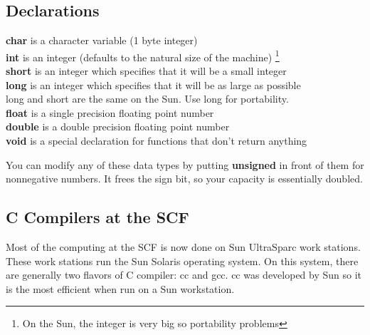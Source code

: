 \documentclass{article}
\begin{document}
\subsection{Declarations}
\label{sec:declarations}

{\bf char} is a character variable (1 byte integer)\\
{\bf int} is an integer (defaults to the natural size of the machine)
\footnote{On the Sun, the integer is very big so portability problems}\\
{\bf short} is an integer which specifies that it will be a small integer\\
{\bf long} is an integer which specifies that it will be as large as possible\\
long and short are the same on the Sun.  Use long for portability.\\
{\bf float} is a single precision floating point number\\
{\bf double} is a double precision floating point number\\
{\bf void} is a special declaration for functions that don't return anything

You can modify any of these data types by putting {\bf unsigned} in 
front of them for nonnegative numbers.  
It frees the sign bit, so your capacity is essentially doubled.

\subsection{C Compilers at the SCF}
\label{sec:compilers}

Most of the computing at the SCF is now done on Sun UltraSparc work
stations.  These work stations run the Sun Solaris operating system.
On this system, there are generally two flavors of C compiler: cc and gcc.  
cc was developed by Sun so it is the most efficient when run on a Sun workstation.
\end{document}
